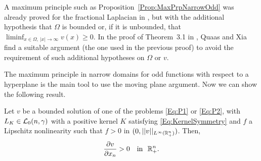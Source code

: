 \begin{remark}
	A maximum principle such as Proposition~\ref{Prop:MaxPrpNarrowOdd} was already proved for the fractional Laplacian in \cite{ChenLiLi-DirectMethod}, but with the additional hypothesis that $\Omega$ is bounded or, if it is unbounded, that $\liminf_{x\in  \Omega,\ |x|\to \infty} v(x) \geq 0$. In the proof of Theorem~3.1 in \cite{QuaasXia}, Quaas and Xia find a suitable argument (the one used in the previous proof) to avoid the requirement of such additional hypotheses on $\Omega$ or $v$.
\end{remark}

The maximum principle in narrow domains for odd functions with respect to a hyperplane is the main tool to use the moving plane argument. Now we can show the following result.

\begin{proposition}
	\label{Prop:MonotonyHalfSpace}
	Let $v$ be a bounded solution of one of the problems \eqref{Eq:P1} or \eqref{Eq:P2}, with $L_K \in \mathcal{L}_0(n,\gamma)$ with a positive kernel $K$ satisfying \eqref{Eq:KernelSymmetry} and $f$ a Lipschitz nonlinearity such that $f>0$ in $(0,||v||_{L^\infty(\mathbb{R}^n_+)})$. Then,
	$$
	\frac{\partial v}{\partial x_n} > 0 \,\,\,\, \text{ in } \,\,\mathbb{R}^n_+.
	$$
\end{proposition}


